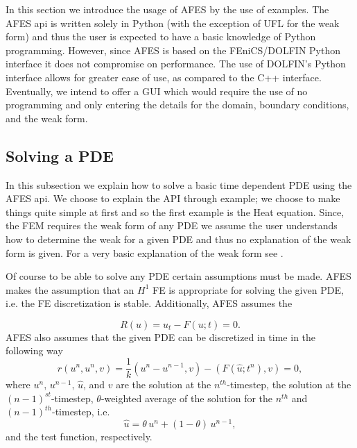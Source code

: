 In this section we introduce the usage of AFES by the use of examples. The AFES
api is written solely in Python (with the exception of UFL for the weak form)
and thus the user is expected to have a basic knowledge of Python programming.
However, since AFES is based on the FEniCS/DOLFIN Python interface it does not
compromise on performance\cite{Alnae2011}. The use of DOLFIN's Python interface
allows for greater ease of use, as compared to the C++ interface. Eventually, we
intend to offer a GUI which would require the use of no programming and only
entering the details for the domain, boundary conditions, and the weak form.

\subsection{Solving a PDE} \label{sse:Solver}

    In this subsection we explain how to solve a basic time dependent PDE using
    the AFES api. We choose to explain the API through example; we choose to
    make things quite simple at first and so the first example is the Heat
    equation.  Since, the FEM requires the weak form of any PDE we assume the
    user understands how to determine the weak for a given PDE and thus no
    explanation of the weak form is given. For a very basic explanation of the
    weak form see \cite[Chapter 6.2.2]{Eriksson2009}.

    Of course to be able to solve any PDE certain assumptions must be made. AFES
    makes the assumption that an $H^1$ FE is appropriate for solving the given
    PDE, i.e. the FE discretization is stable. Additionally, AFES assumes the

    \begin{equation}
        R(u) = u_t - F(u;t) = 0.
        \label{eq:BasicForm}
    \end{equation}
    AFES also assumes that the given PDE can be discretized in time in the
    following way
    \begin{equation}
        r(u^n, u^n, v) = \frac{1}{k} (u^n - u^{n-1}, v) - (F(\hat{u};t^n), v) = 0,
        \label{eq:WeakResidual}
    \end{equation}
    where $u^n,\, u^{n-1},\, \hat{u}$, and $v$ are the solution at the
    $n^{th}$-timestep, the solution at the $(n-1)^{st}$-timestep,
    $\theta$-weighted average of the solution for the $n^{th}$ and
    $(n-1)^{th}$-timestep, i.e.
    \begin{equation}
        \hat{u} = \theta\, u^n + (1 - \theta)\, u^{n-1},
        \label{eq:uAvg}
    \end{equation}
    and the test function, respectively.

